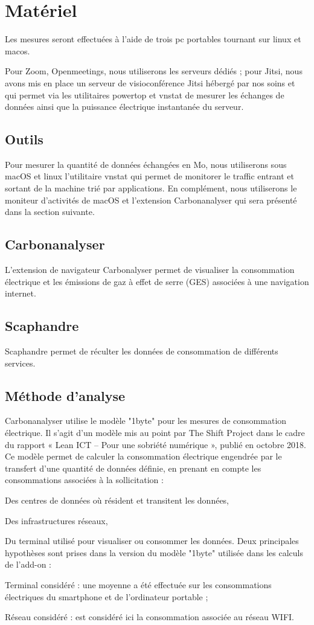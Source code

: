 \documentclass[11pt,a4paper]{article}
\begin{document}
\section{Matériel}
Les mesures seront effectuées à l'aide de trois pc portables tournant sur linux et macos.

Pour Zoom, Openmeetings, nous utiliserons les serveurs dédiés ; pour Jitsi, nous avons mis en place un serveur de visioconférence Jitsi hébergé par nos soins et qui permet via les utilitaires powertop et vnstat de mesurer les échanges de données ainsi que la puissance électrique instantanée du serveur.
\subsection{Outils}
Pour mesurer la quantité de données échangées en Mo, nous utiliserons sous macOS et linux l'utilitaire vnstat qui permet de monitorer le traffic entrant et sortant de la machine trié par applications. En complément, nous utiliserons le moniteur d'activités de macOS et l'extension Carbonanalyser qui sera présenté dans la section suivante.
\subsection{Carbonanalyser}
L’extension de navigateur Carbonalyser permet de visualiser la consommation électrique et les émissions de gaz à effet de serre (GES) associées à une navigation internet.
\subsection{Scaphandre}
Scaphandre permet de réculter les données de consommation de différents services.
\subsection*{Méthode d'analyse}
Carbonanalyser utilise le modèle "1byte" pour les mesures de consommation électrique. Il s'agit d'un modèle mis au point par The Shift Project dans le cadre du rapport « Lean ICT – Pour une sobriété numérique », publié en octobre 2018. Ce modèle permet de calculer la consommation électrique engendrée par le transfert d’une quantité de données définie, en prenant en compte les consommations associées à la sollicitation :
\bi \item Des centres de données où résident et transitent les données,
\item Des infrastructures réseaux,
\item Du terminal utilisé pour visualiser ou consommer les données. \ei
Deux principales hypothèses sont prises dans la version du modèle "1byte" utilisée dans les calculs de l’add-on :
\bi \item Terminal considéré : une moyenne a été effectuée sur les consommations électriques du smartphone et de l’ordinateur portable ;
\item Réseau considéré : est considéré ici la consommation associée au réseau WIFI.  \ei
\end{document}
